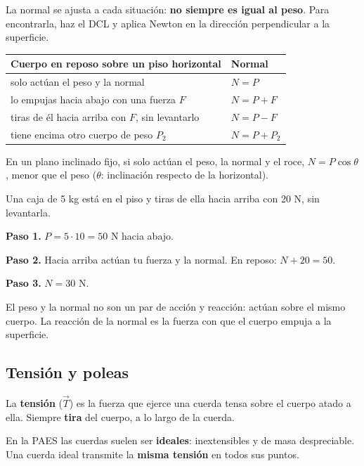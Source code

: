  

La normal se ajusta a cada situación: \textbf{no siempre es igual al peso}. Para encontrarla, haz el DCL y aplica Newton en la dirección perpendicular a la superficie.

 
\begin{center}\small
\begin{tabular}{@{}ll@{}}
\toprule
\textbf{Cuerpo en reposo sobre un piso horizontal} & \textbf{Normal} \\
\midrule
solo actúan el peso y la normal & $N = P$ \\
lo empujas hacia abajo con una fuerza $F$ & $N = P + F$ \\
tiras de él hacia arriba con $F$, sin levantarlo & $N = P - F$ \\
tiene encima otro cuerpo de peso $P_2$ & $N = P + P_2$ \\
\bottomrule
\end{tabular}
\end{center}
 

En un plano inclinado fijo, si solo actúan el peso, la normal y el roce, $N = P\cos\theta$, menor que el peso ($\theta$: inclinación respecto de la horizontal).

  
\begin{ejemplo} Una caja de 5 kg está en el piso y tiras de ella hacia arriba con 20 N, sin levantarla.\par \textbf{Paso 1.} $P = 5\cdot 10 = 50$ N hacia abajo.\par \textbf{Paso 2.} Hacia arriba actúan tu fuerza y la normal. En reposo: $N + 20 = 50$.\par \textbf{Paso 3.} $N = 30$ N.\end{ejemplo}
 
\begin{clave}[{Recuerda}] El peso y la normal no son un par de acción y reacción: actúan sobre el mismo cuerpo. La reacción de la normal es la fuerza con que el cuerpo empuja a la superficie.\end{clave}
\subsection{Tensión y poleas}
La \textbf{tensión} ($\vec T$) es la fuerza que ejerce una cuerda tensa sobre el cuerpo atado a ella. Siempre \textbf{tira} del cuerpo, a lo largo de la cuerda.

 

En la PAES las cuerdas suelen ser \textbf{ideales}: inextensibles y de masa despreciable. Una cuerda ideal transmite la \textbf{misma tensión} en todos sus puntos.

